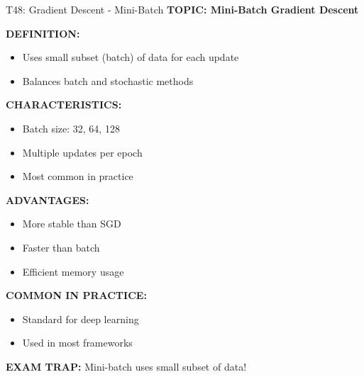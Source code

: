 \documentclass[8pt]{beamer}
\begin{document}
	\begin{frame}{T48: Gradient Descent - Mini-Batch}
		\fontsize{6.5}{7.5}\selectfont
		\textbf{TOPIC: Mini-Batch Gradient Descent}
		
		\vspace{0.1cm}
		\textbf{DEFINITION:}
		\begin{itemize}
			\item Uses small subset (batch) of data for each update
			\item Balances batch and stochastic methods
		\end{itemize}
		
		\vspace{0.1cm}
		\textbf{CHARACTERISTICS:}
		\begin{itemize}
			\item Batch size: 32, 64, 128
			\item Multiple updates per epoch
			\item Most common in practice
		\end{itemize}
		
		\vspace{0.1cm}
		\textbf{ADVANTAGES:}
		\begin{itemize}
			\item More stable than SGD
			\item Faster than batch
			\item Efficient memory usage
		\end{itemize}
		
		\vspace{0.1cm}
		\textbf{COMMON IN PRACTICE:}
		\begin{itemize}
			\item Standard for deep learning
			\item Used in most frameworks
		\end{itemize}
		
		\textcolor{myred}{\textbf{EXAM TRAP:}} Mini-batch uses \textcolor{myblue}{small subset} of data!
	\end{frame}
	
\end{document}
